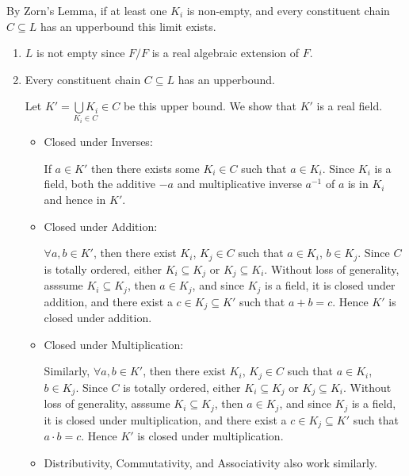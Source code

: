 \documentclass[12pt]{article}
\begin{document}
\begin{solution}
\begin{enumerate}
\begin{enumerate}
            By Zorn's Lemma, if at least one $K_i$ is non-empty, and every constituent chain $C \subseteq L$ has an upperbound this limit exists. 

            \begin{enumerate}
                \item $L$ is not empty since $F/F$ is a real algebraic extension of $F$. 
                \item Every constituent chain $C \subseteq L$ has an upperbound. 
                
                Let $K' = \underset{K_i \in C}{\bigcup K_i} \in C$ be this upper bound. We show that $K'$ is a real field. 
                \begin{itemize}
                    \item Closed under Inverses: 
                    
                    If $a \in K'$ then there exists some $K_i \in C$ such that $a \in K_i$. Since $K_i$ is a field, both the additive $-a$ and multiplicative inverse $a^{-1}$ of $a$ is in $K_i$ and hence in $K'$. 
                    
                    \item Closed under Addition:
                    
                    $\forall a, b \in K'$, then there exist $K_i$, $K_j \in C$ such that $a \in K_i$, $b\in K_j$. Since $C$ is totally ordered, either $K_i \subseteq K_j$ or $K_j \subseteq K_i$. Without loss of generality, asssume $K_i \subseteq K_j$, then $a \in K_j$, and since $K_j$ is a field, it is closed under addition, and there exist a $c \in K_j \subseteq K'$ such that $a + b = c$. Hence $K'$ is closed under addition. 

                    \item Closed under Multiplication:
                    
                    Similarly, $\forall a, b \in K'$, then there exist $K_i$, $K_j \in C$ such that $a \in K_i$, $b\in K_j$. Since $C$ is totally ordered, either $K_i \subseteq K_j$ or $K_j \subseteq K_i$. Without loss of generality, asssume $K_i \subseteq K_j$, then $a \in K_j$, and since $K_j$ is a field, it is closed under multiplication, and there exist a $c \in K_j \subseteq K'$ such that $a \cdot b = c$. Hence $K'$ is closed under multiplication. 

                    \item Distributivity, Commutativity, and Associativity also work similarly. 


\end{itemize}
\end{enumerate}
\end{enumerate}
\end{enumerate}
\end{solution}
\end{document}
